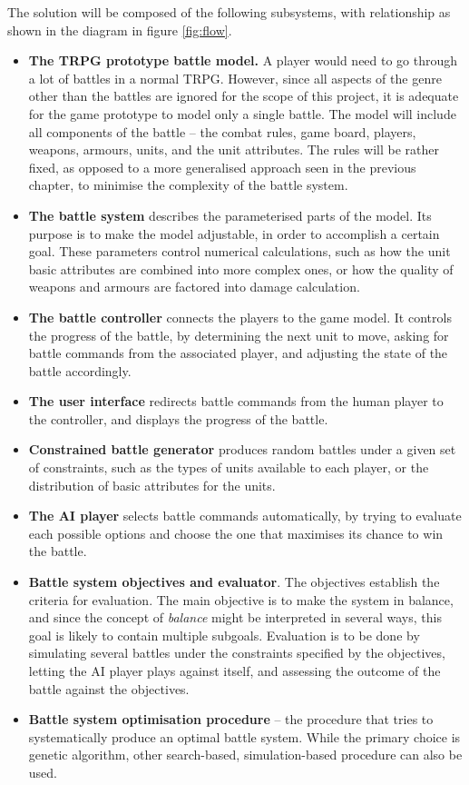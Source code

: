 The solution will be composed of the following subsystems, with relationship as shown in the diagram in figure \ref{fig:flow}.
\begin{itemize}
	\item \textbf{The TRPG prototype battle model.} A player would need to go through a lot of battles in a normal TRPG. However, since all aspects of the genre other than the battles are ignored for the scope of this project, it is adequate for the game prototype to model only a single battle. The model will include all components of the battle -- the combat rules, game board, players, weapons, armours, units, and the unit attributes. The rules will be rather fixed, as opposed to a more generalised approach seen in the previous chapter, to minimise the complexity of the battle system.
	\item \textbf{The battle system} describes the parameterised parts of the model. Its purpose is to make the model adjustable, in order to accomplish a certain goal. These parameters control numerical calculations, such as how the unit basic attributes are combined into more complex ones, or how the quality of weapons and armours are factored into damage calculation.
	\item \textbf{The battle controller} connects the players to the game model. It controls the progress of the battle, by determining the next unit to move, asking for battle commands from the associated player, and adjusting the state of the battle accordingly.
	\item \textbf{The user interface} redirects battle commands from the human player to the controller, and displays the progress of the battle.
	\item \textbf{Constrained battle generator} produces random battles under a given set of constraints, such as the types of units available to each player, or the distribution of basic attributes for the units.
	\item \textbf{The AI player} selects battle commands automatically, by trying to evaluate each possible options and choose the one that maximises its chance to win the battle.
	\item \textbf{Battle system objectives and evaluator}. The objectives establish the criteria for evaluation. The main objective is to make the system in balance, and since the concept of \textit{balance} might be interpreted in several ways, this goal is likely to contain multiple subgoals. Evaluation is to be done by simulating several battles under the constraints specified by the objectives, letting the AI player plays against itself, and assessing the outcome of the battle against the objectives.
	\item \textbf{Battle system optimisation procedure} -- the procedure that tries to systematically produce an optimal battle system. While the primary choice is genetic algorithm, other search-based, simulation-based procedure can also be used.
\end{itemize}

